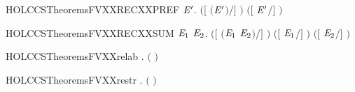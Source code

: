 \newcommand{\HOLCCSTheoremsFVXXRECXXPAR}{\UseVerbatim{HOLCCSTheoremsFVXXRECXXPAR}}
\begin{SaveVerbatim}{HOLCCSTheoremsFVXXRECXXPREF}
\HOLTokenTurnstile{} \HOLSymConst{\HOLTokenForall{}}   \ensuremath{\HOLBoundVar{E}\sp{\prime{}}}.  \ensuremath{(}\ensuremath{[}  \ensuremath{(}\HOLSymConst{\ensuremath{\ldotp}}\ensuremath{\HOLBoundVar{E}\sp{\prime{}}}\ensuremath{)}\ensuremath{/}\ensuremath{]} \ensuremath{)} \HOLSymConst{\ensuremath{=}}  \ensuremath{(}\ensuremath{[}  \ensuremath{\HOLBoundVar{E}\sp{\prime{}}}\ensuremath{/}\ensuremath{]} \ensuremath{)}
\end{SaveVerbatim}
\newcommand{\HOLCCSTheoremsFVXXRECXXPREF}{\UseVerbatim{HOLCCSTheoremsFVXXRECXXPREF}}
\begin{SaveVerbatim}{HOLCCSTheoremsFVXXRECXXSUM}
\HOLTokenTurnstile{} \HOLSymConst{\HOLTokenForall{}}  \ensuremath{\HOLBoundVar{E}\sb{\mathrm{1}}} \ensuremath{\HOLBoundVar{E}\sb{\mathrm{2}}}.
      \ensuremath{(}\ensuremath{[}  \ensuremath{(}\ensuremath{\HOLBoundVar{E}\sb{\mathrm{1}}} \HOLSymConst{\ensuremath{+}} \ensuremath{\HOLBoundVar{E}\sb{\mathrm{2}}}\ensuremath{)}\ensuremath{/}\ensuremath{]} \ensuremath{)} \HOLSymConst{\ensuremath{=}}
      \ensuremath{(}\ensuremath{[}  \ensuremath{\HOLBoundVar{E}\sb{\mathrm{1}}}\ensuremath{/}\ensuremath{]} \ensuremath{)} \HOLConst{\HOLTokenUnion{}}  \ensuremath{(}\ensuremath{[}  \ensuremath{\HOLBoundVar{E}\sb{\mathrm{2}}}\ensuremath{/}\ensuremath{]} \ensuremath{)}
\end{SaveVerbatim}
\newcommand{\HOLCCSTheoremsFVXXRECXXSUM}{\UseVerbatim{HOLCCSTheoremsFVXXRECXXSUM}}
\begin{SaveVerbatim}{HOLCCSTheoremsFVXXrelab}
\HOLTokenTurnstile{} \HOLSymConst{\HOLTokenForall{}} .  \ensuremath{(}  \ensuremath{)} \HOLSymConst{\ensuremath{=}}  
\end{SaveVerbatim}
\newcommand{\HOLCCSTheoremsFVXXrelab}{\UseVerbatim{HOLCCSTheoremsFVXXrelab}}
\begin{SaveVerbatim}{HOLCCSTheoremsFVXXrestr}
\HOLTokenTurnstile{} \HOLSymConst{\HOLTokenForall{}} .  \ensuremath{(}  \ensuremath{)} \HOLSymConst{\ensuremath{=}}  
\end{SaveVerbatim}
